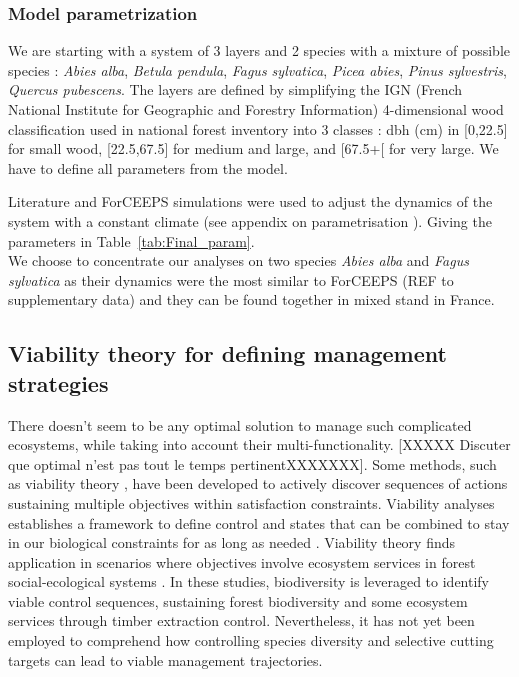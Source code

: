 \documentclass{article}
\begin{document}
\subsubsection{Model parametrization}

We are starting with a system of 3 layers and 2 species with a mixture of possible species : \textit{Abies alba}, \textit{Betula pendula}, \textit{Fagus sylvatica}, \textit{Picea abies}, \textit{Pinus sylvestris}, \textit{Quercus pubescens}. The layers are defined by simplifying the IGN (French National Institute for Geographic and Forestry Information) 4-dimensional wood classification used in national forest inventory into 3 classes : dbh (cm) in [0,22.5] for small wood, [22.5,67.5] for medium and large, and [67.5+[ for very large. We have to define all parameters from the model.

Literature and ForCEEPS simulations were used to adjust the dynamics of the system with a constant climate (see appendix on parametrisation \autocite{bugmannEcologyMountainousForests1994,morinForestSuccessionGap2021}). Giving the parameters in Table~\ref{tab:Final_param}.\\
We choose to concentrate our analyses on two species \textit{Abies alba} and \textit{Fagus sylvatica} as their dynamics were the most similar to ForCEEPS (REF to supplementary data) and they can be found together in mixed stand in France.

\subsection{Viability theory for defining management strategies}

There doesn't seem to be any optimal solution to manage such complicated ecosystems, while taking into account their multi-functionality. [XXXXX Discuter que optimal n'est pas tout le temps pertinentXXXXXXX]. Some methods, such as viability theory \autocite{aubinStochasticViabilityInvariance1990}, have been developed to actively discover sequences of actions sustaining multiple objectives within satisfaction constraints. Viability analyses establishes a framework to define control and states that can be combined to stay in our biological constraints for as long as needed \autocite{rougeExtendingViabilityTheory2013}.
Viability theory finds application in scenarios where objectives involve ecosystem services in forest social-ecological systems \autocite{mathiasUsingViabilityTheory2015}. In these studies, biodiversity is leveraged to identify viable control sequences, sustaining forest biodiversity and some ecosystem services through timber extraction control.
Nevertheless, it has not yet been employed to comprehend how controlling species diversity and selective cutting targets can lead to viable management trajectories.
\end{document}
